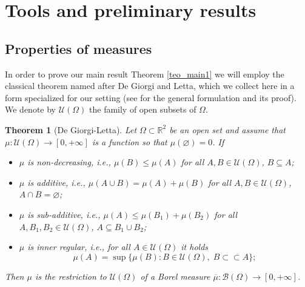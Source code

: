 \documentclass[a4paper,11pt]{article}
\numberwithin{equation}{section}
\newtheorem{theorem}{Theorem}[section]
\newcommand{\Om}{\Omega}
\newcommand{\R}{\mathbb{R}}
\begin{document}
\section{Tools and preliminary results}\label{sec_preliminaryresults}

\subsection{Properties of measures}
In order to prove our main result Theorem \ref{teo_main1} we will employ the classical theorem named after De Giorgi and Letta, which we collect here in a form specialized for our setting (see \cite[Theorem 1.53]{AmFuPa:00} for the general formulation and its proof).
We denote by $\mathcal U(\Om)$ the family of open subsets of $\Om$.
\begin{theorem}[De Giorgi-Letta]\label{DGL_teo}
	Let $\Om\subset\R^2$ be an open set and assume that $\mu:\mathcal U(\Om)\rightarrow [0,+\infty]$ is a function so that $\mu(\varnothing)=0$. If
	\begin{itemize}
\item[(i)] $\mu$ is non-decreasing, i.e., $\mu(B)\leq \mu(A)$ for all $A,B\in \mathcal U(\Om)$, $B\subseteq A$;
\item[(ii)] $\mu$ is additive, i.e., $\mu(A\cup B)=\mu(A)+\mu(B)$ for all $A,B\in \mathcal U(\Om)$, $A\cap B=\varnothing$;
\item[(iii)] $\mu$ is sub-additive, i.e., $\mu(A)\leq \mu(B_1)+\mu(B_2)$ for all $A,B_1,B_2\in \mathcal U(\Om)$, $A\subseteq  B_1\cup B_2$;
\item[(iv)] $\mu$ is inner regular, i.e., for all $A\in \mathcal U(\Om)$ it holds
$$\mu(A)=\sup\{\mu(B):B\in \mathcal U(\Om),\;B\subset\subset A\};$$
	\end{itemize}
Then $\mu$ is the restriction to $\mathcal U(\Om)$ of a Borel measure $\overline \mu:\mathcal B(\Om)\rightarrow [0,+\infty]$.
\end{theorem}
\end{document}
